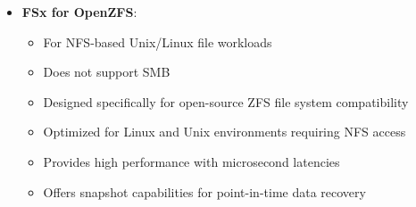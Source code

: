 \documentclass[11pt,a4paper]{report}
\begin{document}
\begin{itemize}
\begin{itemize}
\begin{itemize}
  \item Implement ElastiCache to cache frequently accessed, identical datasets
  \item Significantly reduces load on primary database servers
  \item Delivers in-memory performance for frequently accessed data
\end{itemize}
  \item More effective than read replicas for caching identical query results
  \item Better solution than SNS or Kinesis which aren't designed for caching database responses
  \item Ideal for ecommerce applications where the same product information is repeatedly requested
\end{itemize}
  \item \textbf{FSx for OpenZFS}:
\begin{itemize}
  \item For NFS-based Unix/Linux file workloads
  \item Does not support SMB
  \item Designed specifically for open-source ZFS file system compatibility
  \item Optimized for Linux and Unix environments requiring NFS access
  \item Provides high performance with microsecond latencies
  \item Offers snapshot capabilities for point-in-time data recovery
\end{itemize}
\end{itemize}
\end{document}

